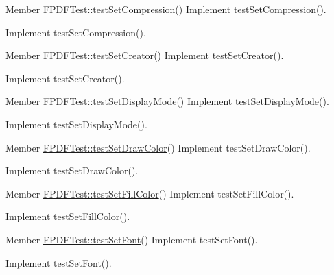 \begin{DoxyDescription}
\item[Member \hyperlink{class_f_p_d_f_test_a8ebed7f7815638ce4ab1e59c5b330989}{FPDFTest::testSetCompression}() ]Implement testSetCompression().

Implement testSetCompression().
\end{DoxyDescription}

\label{todo__todo000163}
\hypertarget{todo__todo000163}{}
 
\begin{DoxyDescription}
\item[Member \hyperlink{class_f_p_d_f_test_a3f1c075d3b84a45f8aa62a51df8e9313}{FPDFTest::testSetCreator}() ]Implement testSetCreator().

Implement testSetCreator().
\end{DoxyDescription}

\label{todo__todo000157}
\hypertarget{todo__todo000157}{}
 
\begin{DoxyDescription}
\item[Member \hyperlink{class_f_p_d_f_test_ae36fa8e2ac120c6047095132f6702b99}{FPDFTest::testSetDisplayMode}() ]Implement testSetDisplayMode().

Implement testSetDisplayMode().
\end{DoxyDescription}

\label{todo__todo000172}
\hypertarget{todo__todo000172}{}
 
\begin{DoxyDescription}
\item[Member \hyperlink{class_f_p_d_f_test_a9fef98ec07c3c5af5a9b295a34fe0a32}{FPDFTest::testSetDrawColor}() ]Implement testSetDrawColor().

Implement testSetDrawColor().
\end{DoxyDescription}

\label{todo__todo000173}
\hypertarget{todo__todo000173}{}
 
\begin{DoxyDescription}
\item[Member \hyperlink{class_f_p_d_f_test_a08cff29015594e20886053b7ae7cc897}{FPDFTest::testSetFillColor}() ]Implement testSetFillColor().

Implement testSetFillColor().
\end{DoxyDescription}

\label{todo__todo000180}
\hypertarget{todo__todo000180}{}
 
\begin{DoxyDescription}
\item[Member \hyperlink{class_f_p_d_f_test_a36bed25ac66224faa8a65bc191926ce1}{FPDFTest::testSetFont}() ]Implement testSetFont().

Implement testSetFont().
\end{DoxyDescription}

